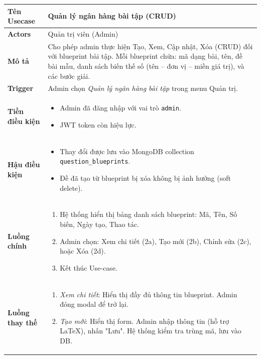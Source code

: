 \begin{longtable}{|p{}|p{}|}
\hline
\textbf{Tên Usecase} & \textbf{Quản lý ngân hàng bài tập (CRUD)} \\
\hline
\textbf{Actors} & Quản trị viên (Admin) \\
\hline
\textbf{Mô tả} & 
Cho phép admin thực hiện Tạo, Xem, Cập nhật, Xóa (CRUD) đối với blueprint bài tập. Mỗi blueprint chứa: mã dạng bài, tên, đề bài mẫu, danh sách biến thế số (tên – đơn vị – miền giá trị), và các bước giải. \\
\hline
\textbf{Trigger} & Admin chọn \textit{Quản lý ngân hàng bài tập} trong menu Quản trị. \\
\hline
\textbf{Tiền điều kiện} & 
\vspace{-\baselineskip}
\begin{itemize}[topsep=2pt, itemsep=0pt]
    \item Admin đã đăng nhập với vai trò \texttt{admin}.
    \item JWT token còn hiệu lực.
\end{itemize} \\
\hline
\textbf{Hậu điều kiện} & 
\vspace{-\baselineskip}
\begin{itemize}[topsep=2pt, itemsep=0pt]
    \item Thay đổi được lưu vào MongoDB collection \texttt{question\_blueprints}.
    \item Đề đã tạo từ blueprint bị xóa không bị ảnh hưởng (soft delete).
\end{itemize} \\
\hline
\textbf{Luồng chính} &
\vspace{-\baselineskip}
\begin{enumerate}[topsep=2pt, itemsep=0pt]
    \item Hệ thống hiển thị bảng danh sách blueprint: Mã, Tên, Số biến, Ngày tạo, Thao tác.
    \item Admin chọn: Xem chi tiết (2a), Tạo mới (2b), Chỉnh sửa (2c), hoặc Xóa (2d).
    \item Kết thúc Use-case.
\end{enumerate} \\
\hline
\textbf{Luồng thay thế} &
\vspace{-\baselineskip}
\begin{enumerate}[topsep=2pt, itemsep=0pt]
    \item[2a.] \textit{Xem chi tiết}: Hiển thị đầy đủ thông tin blueprint. Admin đóng modal để trở lại.
    \item[2b.] \textit{Tạo mới}: Hiển thị form. Admin nhập thông tin (hỗ trợ LaTeX), nhấn "Lưu". Hệ thống kiểm tra trùng mã, lưu vào DB.

\end{enumerate}
\end{longtable}
